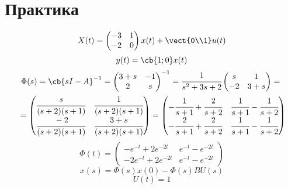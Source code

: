 \section{Практика}
\begin{equation}
X(t) = \begin{pmatrix}
-3 & 1 \\
-2 & 0
\end{pmatrix} x(t) + \vect{0\\1} u(t)
\end{equation} 
\begin{equation}
y(t) = \cb{1;0} x(t)
\end{equation}
\begin{multline}
\Phi(s) = \cb{sI-A}^{-1} = \begin{pmatrix}
3+s & -1 \\
2 & s
\end{pmatrix}^{-1} = \cfrac1{s^2+3s+2}\begin{pmatrix}
s & 1 \\
-2 & 3+s
\end{pmatrix} = {} \\ {} = \begin{pmatrix}
\cfrac s{(s+2)(s+1)} & \cfrac 1{(s+2)(s+1)} \\
\cfrac {-2}{(s+2)(s+1)} & \cfrac {3+s}{(s+2)(s+1)}
\end{pmatrix} = \begin{pmatrix}
-\cfrac1{s+1} + \cfrac2{s+2} & \cfrac1{s+1} - \cfrac1{s+2}\\
-\cfrac2{s+1} + \cfrac2{s+2} & \cfrac1{s+1} - \cfrac1{s+2}
\end{pmatrix}
\end{multline}
\begin{equation}
\Phi(t) = \begin{pmatrix}
-e^{-t} +2e^{-2t} & e^{-t} - e^{-2t}\\
-2e^{-t} +2e^{-2t} & e^{-t} - e^{-2t}
\end{pmatrix}
\end{equation}
\begin{equation}
x(s) = \Phi(s) x(0) - \Phi(s) B U(s)
\end{equation}
\begin{equation}
U(t) = 1
\end{equation}